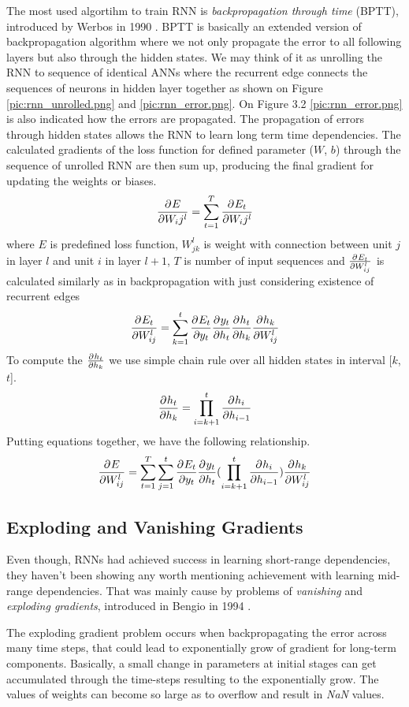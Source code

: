The most used algortihm to train RNN is \textit{backpropagation through time} (BPTT), introduced by Werbos in 1990 \cite{werbos_bptt}.
BPTT is basically an extended version of backpropagation algorithm where we not only propagate the error to all following layers but also through the hidden states.
We may think of it as unrolling the RNN to sequence of identical ANNs where the recurrent edge connects the sequences of neurons in hidden layer together as shown on Figure \ref{pic:rnn_unrolled.png} and \ref{pic:rnn_error.png}.
On Figure 3.2 \ref{pic:rnn_error.png} is also indicated how the errors are propagated.
The propagation of errors through hidden states allows the RNN to learn long term time dependencies.
The calculated gradients of the loss function for defined parameter ($W$, $b$) through the sequence of unrolled RNN are then sum up, producing the final gradient for updating the weights or biases.
\[ \frac{\partial^{} E}{\partial W_ij^l} = \sum_{t=1}^{T}\frac{\partial^{} E_t}{\partial W_ij^l} \]
where $E$ is predefined loss function, ${W_{jk}^l}$ is weight with connection between unit $j$ in layer $l$ and unit $i$ in layer $l+1$, $T$ is number of input sequences and $\frac{\partial^{} E_t}{\partial W_{ij}^l}$ is calculated similarly as in backpropagation with just considering existence of recurrent edges
\[ \frac{\partial^{} E_t}{\partial W_{ij}^l} = \sum_{k=1}^{t}\frac{\partial^{} E_t}{\partial y_t}\frac{\partial^{} y_t}{\partial h_t}\frac{\partial^{} h_t}{\partial h_k}\frac{\partial^{} h_k}{\partial W_{ij}^l} \]
To compute the $\frac{\partial^{} h_t}{\partial h_k}$ we use simple chain rule over all hidden states in interval [$k$,$t$].
\[ \frac{\partial^{} h_t}{\partial h_k} = \prod_{i=k+1}^{t}\frac{\partial^{} h_i}{\partial h_{i-1}} \]
Putting equations together, we have the following relationship\cite{rnn_dif}.
\[  \frac{\partial^{} E}{\partial W_{ij}^l} = \sum_{t=1}^{T}\sum_{j=1}^{t}\frac{\partial^{} E_t}{\partial y_t}\frac{\partial^{} y_t}{\partial h_t}(\prod_{i=k+1}^{t}\frac{\partial^{} h_i}{\partial h_{i-1}})\frac{\partial^{} h_k}{\partial W_{ij}^l} \]

\subsection{Exploding and Vanishing Gradients}

Even though, RNNs had achieved success in learning short-range dependencies, they haven’t been showing any worth mentioning achievement with learning mid-range dependencies.
That was mainly cause by problems of \textit{vanishing} and \textit{exploding gradients}, introduced in Bengio in 1994 \cite{vanishing_gradient}.

The exploding gradient problem occurs when backpropagating the error across many time steps, that could lead to exponentially grow of gradient for long-term components.
Basically, a small change in parameters at initial stages can get accumulated through the time-steps resulting to the exponentially
 grow.
The values of weights can become so large as to overflow and result in \textit{NaN} values.

